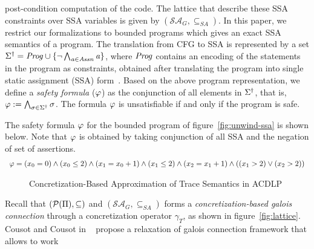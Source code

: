 {post-condition computation of the code.
The lattice that describe these SSA constraints over SSA 
variables is given by $(\mathcal{SA}_G, \subseteq_{SA})$.  
%
%
In this paper,  we restrict our formalizations to bounded programs which 
gives an exact SSA semantics of a program.  
%
%
The translation from CFG to SSA is represented by a set 
$\Sigma^\dagger=\mathit{Prog}\cup\{\neg \bigwedge_{\mathit{a}\in\mathit{Assn}} \mathit{a}\}$,
where $\mathit{Prog}$ contains an encoding of the statements in the program as
constraints, obtained after translating the program into single static 
assignment (SSA) form~\cite{ssa88,ssa1988,ssa1991}. 
%
Based on the above program representation, we define a \textit{safety formula}
($\varphi$) as the conjunction of all elements in $\Sigma^\dagger$, that is,  
$\varphi:= \bigwedge_{\sigma\in\Sigma^\dagger} \sigma$.  The formula 
$\varphi$ is unsatisfiable if and only if the program is safe.
%
\begin{example}
The safety formula $\varphi$ for the bounded program of 
figure~\ref{fig:unwind-ssa} is shown below.  Note that $\varphi$ is obtained
by taking conjunction of all SSA and the negation of set of assertions. 
%
\begin{equation}\label{eq:ssa}
\begin{array}{l}
  \varphi = (x_0 = 0) \wedge
     (x_0 \leq 2) \wedge
     (x_1 = x_0 + 1) \wedge
     (x_1 \leq 2) \wedge
     (x_2 = x_1 + 1) \wedge
     ((x_1 > 2) \vee (x_2 > 2)) 
\end{array}
\end{equation}
\end{example}
%
%
\begin{figure}[htbp]
\centering
\vspace*{-0.2cm}
\caption{Concretization-Based Approximation of Trace Semantics in ACDLP
  \label{fig:syn-map}}
\end{figure}
%
Recall that $(\mathcal{P}(\Pi),\subseteq)$ and $(\mathcal{SA}_G, \subseteq_{SA})$ 
forms a \emph{concretization-based galois connection} through a concretization
operator $\gamma_T$, as shown in figure~\ref{fig:lattice}. Cousot and Cousot in
~\cite{CC92} propose a relaxation of galois connection framework that allows to work
}
